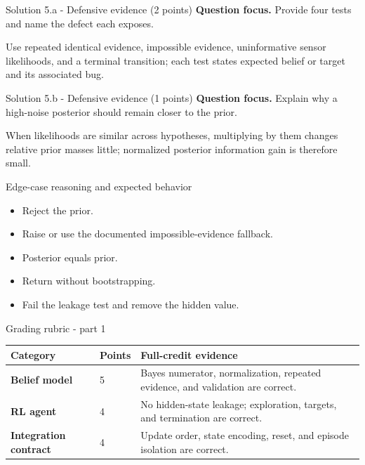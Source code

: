 \documentclass[aspectratio=169,11pt]{beamer}
\begin{document}
\begin{frame}{Solution 5.a - Defensive evidence (2 points)}
\small
\textbf{Question focus.} Provide four tests and name the defect each exposes.

\vspace{0.25cm}
\answerlabel Use repeated identical evidence, impossible evidence, uninformative sensor likelihoods, and a terminal transition; each test states expected belief or target and its associated bug.
\end{frame}

\begin{frame}{Solution 5.b - Defensive evidence (1 points)}
\small
\textbf{Question focus.} Explain why a high-noise posterior should remain closer to the prior.

\vspace{0.25cm}
\answerlabel When likelihoods are similar across hypotheses, multiplying by them changes relative prior masses little; normalized posterior information gain is therefore small.
\end{frame}

\begin{frame}{Edge-case reasoning and expected behavior}
\small
\begin{itemize}
  \item Reject the prior.
  \item Raise or use the documented impossible-evidence fallback.
  \item Posterior equals prior.
  \item Return without bootstrapping.
  \item Fail the leakage test and remove the hidden value.
\end{itemize}
\end{frame}

\begin{frame}{Grading rubric - part 1}
\scriptsize
\begin{tabularx}{\textwidth}{>{\bfseries}p{} p{} X}
\toprule
Category & Points & Full-credit evidence \\
\midrule
Belief model & 5 & Bayes numerator, normalization, repeated evidence, and validation are correct. \\
RL agent & 4 & No hidden-state leakage; exploration, targets, and termination are correct. \\
Integration contract & 4 & Update order, state encoding, reset, and episode isolation are correct. \\
\bottomrule
\end{tabularx}
\end{frame}
\end{document}
